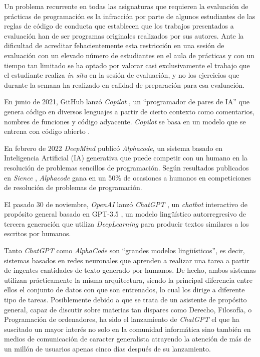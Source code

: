 \documentclass[twocolumn,twoside,a4paper, 10pt]{article}
\newcommand{\ChatGPT}{\textit{ChatGPT}{}}           %
\begin{document}
Un problema recurrente en todas las asignaturas que requieren la evaluación de prácticas de programación es la
infracción por parte de algunos estudiantes de las reglas de código de conducta que establecen que los
trabajos presentados a evaluación han de ser programas originales realizados por sus autores.
Ante la dificultad de acreditar fehacientemente esta restricción en una sesión de evaluación con un elevado
número de estudiantes en el aula de prácticas y con un tiempo tan limitado se ha optado por valorar
casi exclusivamente el trabajo que el estudiante realiza \textit{in situ} en la sesión de evaluación, y no los
ejercicios que durante la semana ha realizado en calidad de preparación para esa evaluación.

En junio de 2021, GitHub lanzó \textit{Copilot} 
\cite{Nguyen:2022:AnEE},
un ``programador de pares de IA'' que genera 
código en diversos lenguajes a partir de cierto contexto como comentarios, nombres de funciones y código adyacente. 
\textit{Copilot} se basa en un modelo que se entrena con código abierto \cite{Chen:2021:ELL}.

En febrero de 2022 \textit{DeepMind} publicó \textit{Alphacode}, un sistema basado en Inteligencia Artificial
(IA) generativa que puede competir con un humano en la resolución de problemas sencillos de programación.
Según resultados publicados en \textit{Sience} \cite{Li:2022:CCG}, \textit{Alphacode} gana en un 50\%
de ocasiones a humanos en competiciones de resolución de problemas de programación.

El pasado 30 de noviembre, \textit{OpenAI} lanzó \ChatGPT{}
\cite{Zhang:2020:chatgpt}, 
un \textit{chatbot} interactivo de propósito general basado en GPT-3.5
\cite{Floridi:2020:GPT-3},
un modelo lingüístico autorregresivo de tercera generación que utiliza \textit{DeepLearning} para producir textos 
similares a los escritos por humanos.

Tanto \ChatGPT{} como \textit{AlphaCode} son ``grandes modelos lingüísticos'', es decir, sistemas basados en 
redes neuronales que aprenden a realizar una tarea a partir de ingentes cantidades de texto generado por humanos. 
De hecho, ambos sistemas utilizan prácticamente la misma arquitectura, siendo la principal diferencia entre
ellos el conjunto de datos con que son entrenados, lo cual los dirige a diferente tipo de tareas.
Posiblemente debido a que se trata de un asistente de propósito general, capaz de discutir sobre materias tan dispares 
como Derecho, Filosofía, o Programación de ordenadores, ha sido el lanzamiento de \ChatGPT{} el que ha suscitado un mayor
interés no solo en la comunidad informática sino también en medios de comunicación de caracter generalista
\cite{Perez:2022:FBM} 
atrayendo la atención de más de un millón de usuarios apenas cinco días después de su lanzamiento.
\end{document}

